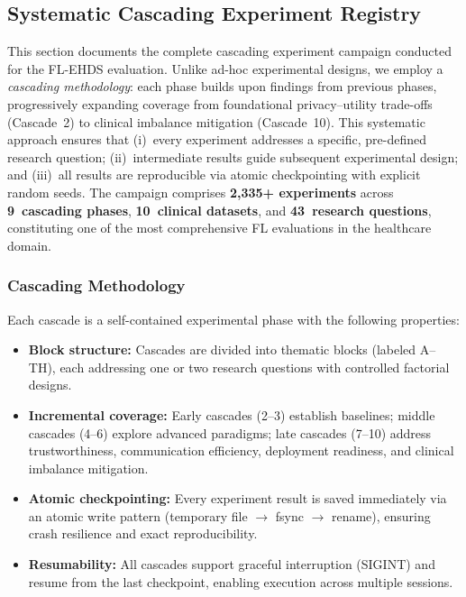 \documentclass[conference]{IEEEtran}
\begin{document}
\subsection{Systematic Cascading Experiment Registry}
\label{sec:cascade_registry}

This section documents the complete cascading experiment campaign conducted for the FL-EHDS evaluation. Unlike ad-hoc experimental designs, we employ a \textit{cascading methodology}: each phase builds upon findings from previous phases, progressively expanding coverage from foundational privacy--utility trade-offs (Cascade~2) to clinical imbalance mitigation (Cascade~10). This systematic approach ensures that (i)~every experiment addresses a specific, pre-defined research question; (ii)~intermediate results guide subsequent experimental design; and (iii)~all results are reproducible via atomic checkpointing with explicit random seeds. The campaign comprises \textbf{2,335+ experiments} across \textbf{9~cascading phases}, \textbf{10~clinical datasets}, and \textbf{43~research questions}, constituting one of the most comprehensive FL evaluations in the healthcare domain.

\subsubsection{Cascading Methodology}

Each cascade is a self-contained experimental phase with the following properties:

\begin{itemize}
    \item \textbf{Block structure:} Cascades are divided into thematic blocks (labeled A--TH), each addressing one or two research questions with controlled factorial designs.
    \item \textbf{Incremental coverage:} Early cascades (2--3) establish baselines; middle cascades (4--6) explore advanced paradigms; late cascades (7--10) address trustworthiness, communication efficiency, deployment readiness, and clinical imbalance mitigation.
    \item \textbf{Atomic checkpointing:} Every experiment result is saved immediately via an atomic write pattern (temporary file $\to$ fsync $\to$ rename), ensuring crash resilience and exact reproducibility.
    \item \textbf{Resumability:} All cascades support graceful interruption (SIGINT) and resume from the last checkpoint, enabling execution across multiple sessions.
\end{itemize}
\end{document}
